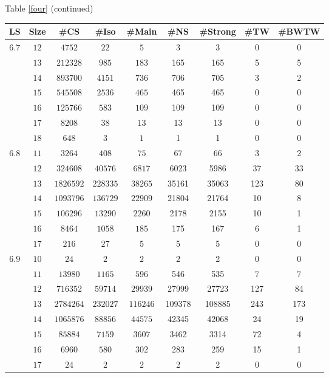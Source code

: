 \newpage
\begin{center}
Table \ref{four} (continued)
\begin{tabular}{|c|c|c|c|c|c|c|c|c|} \hline
LS & Size & \#CS & \#Iso & \#Main& \#NS & \#Strong & \#TW & \#BWTW \\ \hline
$6.7$ & $12$  & $4752$ & $22$ & $5$ & 3 & 3 & 0 & 0 \\
      & $13$  & $212328$ & $985$ & $183$ & 165 & 165 & 5 & 5 \\
      & $14$  & $893700$ & $4151$ & $736$ & 706 & 705 & 3 & 2 \\
      & $15$  & $545508$ & $2536$ & $465$ & 465 & 465 & 0 & 0 \\
      & $16$  & $125766$ & $583$ & $109$ & 109 & 109 & 0 & 0 \\
      & $17$  & $8208$ & $38$ & $13$ & 13 & 13 & 0 & 0 \\ 
      & $18$  & $648$ & $3$ & $1$ & 1 & 1 & 0 & 0 \\ \hline
$6.8$ & $11$  & $3264$ & $408$ & $75$ & 67 & 66 & 3 & 2 \\
      & $12$  & $324608$ & $40576$ & $6817$ & 6023 & 5986 & 37 & 33 \\
      & $13$  & $1826592$ & $228335$ & $38265$ & 35161 & 35063 & 123 & 80 \\
      & $14$  & $1093796$ & $136729$ & $22909$ & 21804 & 21764 & 10 & 8 \\
      & $15$  & $106296$ & $13290$ & $2260$ & 2178 & 2155 & 10 & 1 \\
      & $16$  & $8464$ & $1058$ & $185$ & 175 & 167 & 6 & 1 \\ 
      & $17$  & $216$ & $27$ & $5$ & 5 & 5 & 0 & 0 \\ \hline
$6.9$ & $10$  & $24$ & $2$ & $2$ & 2 & 2 & 0 & 0 \\
      & $11$  & $13980$ & $1165$ & $596$ & 546 & 535 & 7 & 7 \\
      & $12$  & $716352$ & $59714$ & $29939$ & 27999 & 27723 & 127 & 84 \\
      & $13$  & $2784264$ & $232027$ & $116246$ & 109378 & 108885 & 243 & 173 \\
      & $14$  & $1065876$ & $88856$ & $44575$ & 42345 & 42068 & 24 & 19 \\
      & $15$  & $85884$ & $7159$ & $3607$ & 3462 & 3314 & 72 & 4 \\
      & $16$  & $6960$ & $580$ & $302$ & 283 & 259 & 15 & 1 \\ 
      & $17$  & $24$ & $2$ & $2$ & 2 & 2 & 0 & 0 \\ \hline
\end{tabular}\vspace {3mm} \\
\end{center}
